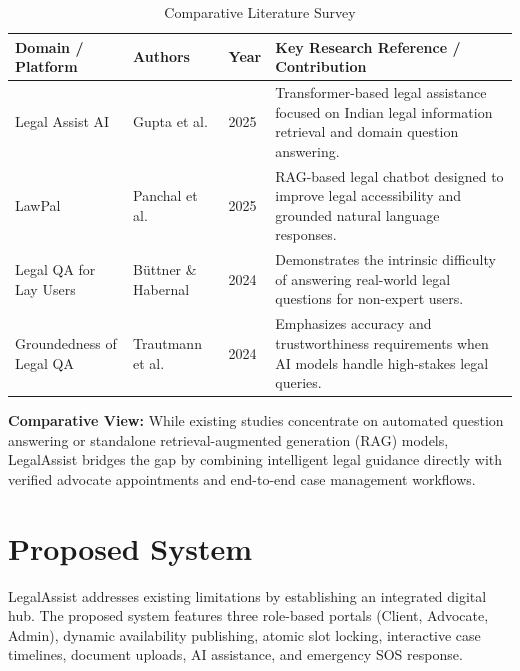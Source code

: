 \begin{table}[h!]
    \centering
    \caption{Comparative Literature Survey}
    \label{tab:literature_survey}
    \small
    \begin{tabular}{p{3.5cm} p{3.2cm} p{1.2cm} p{6.5cm}}
        \toprule
        \textbf{Domain / Platform} & \textbf{Authors} & \textbf{Year} & \textbf{Key Research Reference / Contribution} \\
        \midrule
        Legal Assist AI & Gupta et al. & 2025 & Transformer-based legal assistance focused on Indian legal information retrieval and domain question answering. \\
        \addlinespace
        LawPal & Panchal et al. & 2025 & RAG-based legal chatbot designed to improve legal accessibility and grounded natural language responses. \\
        \addlinespace
        Legal QA for Lay Users & Büttner \& Habernal & 2024 & Demonstrates the intrinsic difficulty of answering real-world legal questions for non-expert users. \\
        \addlinespace
        Groundedness of Legal QA & Trautmann et al. & 2024 & Emphasizes accuracy and trustworthiness requirements when AI models handle high-stakes legal queries. \\
        \bottomrule
    \end{tabular}
\end{table}

\noindent \textbf{Comparative View:} While existing studies concentrate on automated question answering or standalone retrieval-augmented generation (RAG) models, LegalAssist bridges the gap by combining intelligent legal guidance directly with verified advocate appointments and end-to-end case management workflows.

\section{Proposed System}
LegalAssist addresses existing limitations by establishing an integrated digital hub. The proposed system features three role-based portals (Client, Advocate, Admin), dynamic availability publishing, atomic slot locking, interactive case timelines, document uploads, AI assistance, and emergency SOS response.

